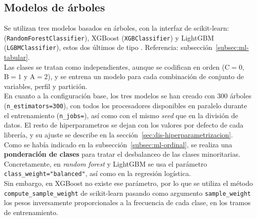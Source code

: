 
\subsection{Modelos de árboles}
\label{subsec:dis-modelos-arboles}

Se utilizan tres modelos basados en árboles, con la interfaz de scikit-learn:  (\texttt{Random\allowbreak Forest\allowbreak Classifier}), XGBoost (\texttt{XGB\allowbreak Classifier}) y LightGBM (\texttt{LGBM\allowbreak Classifier}), estos dos últimos de tipo . Referencia: subsección~\ref{subsec:ml-tabular}.
\\

Las clases se tratan como independientes, aunque se codifican en orden ($\mathrm{C} = 0$, $\mathrm{B} = 1$ y $\mathrm{A} = 2$), y se entrena un modelo para cada combinación de conjunto de variables, perfil y partición.
\\

En cuanto a la configuración base, los tres modelos se han creado con 300 árboles (\mbox{\texttt{n\_estimators=300}}), con todos los procesadores disponibles en paralelo durante el entrenamiento (\texttt{n\_jobs=}), así como con el mismo \textit{seed} que en la división de datos. El resto de \glspl{hiperparametro} se dejan con los valores por defecto de cada librería, y su ajuste se describe en la sección~\ref{sec:dis-hiperparametrizacion}.
\\

Como se había indicado en la subsección~\ref{subsec:ml-ordinal}, se realiza una \textbf{ponderación de clases} para tratar el desbalanceo de las clases minoritarias. Concretamente, en \textit{random forest} y LightGBM se usa el parámetro \texttt{class\_\allowbreak weight=\allowbreak "balanced"}, así como en la regresión logística.
\\

Sin embargo, en XGBoost no existe ese parámetro, por lo que se utiliza el método \mbox{\texttt{compute\_sample\_weight}} de scikit-learn pasando como argumento \texttt{sample\_weight} los pesos inversamente proporcionales a la frecuencia de cada clase, en los tramos de entrenamiento.
\\

